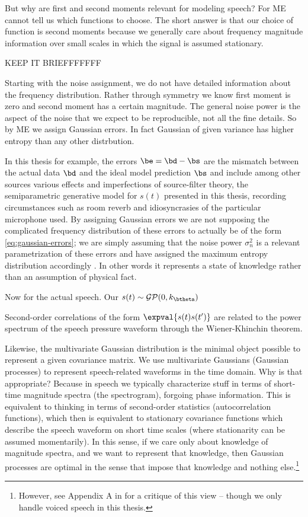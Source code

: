 \begin{chapterappendices}{5}
But why are first and second moments relevant for modeling speech?
For ME cannot tell us which functions to choose.
The short answer is that our choice of function is second moments because we generally care about frequency magnitude information over small scales in which the signal is assumed stationary.

KEEP IT BRIEFFFFFFF

Starting with the noise assignment, we do not have detailed information about the frequency distribution.
Rather through symmetry we know first moment is zero and second moment has a certain magnitude.
The general noise power is the aspect of the noise that we expect to be reproducible, not all the fine details.
So by ME we assign Gaussian errors.
In fact Gaussian of given variance has higher entropy than any other distrbution.

In this thesis for example,
the errors $\be = \bd - \bs$ are the mismatch between the actual data $\bd$ and the ideal model prediction $\bs$ and include among other sources various effects and imperfections of source-filter theory, the semiparametric generative model for $s(t)$ presented in this thesis, recording circumstances such as room reverb and idiosyncrasies of the particular microphone used.
By assigning Gaussian errors we are not supposing the complicated frequency distribution of these errors to actually be of the form \eqref{eq:gaussian-errors}; we are simply assuming that the noise power $\sigma_n^2$ is a relevant parametrization of these errors \citep{Bretthorst1999} and have assigned the maximum entropy distribution accordingly \citep{Jaynes2003}.
In other words it represents a state of knowledge rather than an assumption of physical fact.

Now for the actual speech.
Our $s(t) \sim \mathcal{GP}(0,k_\btheta)$

Second-order correlations of the form $\expval{s(t)s(t')}$ are related to the power spectrum of the speech pressure waveform through the Wiener-Khinchin theorem.


Likewise, the multivariate Gaussian distribution is the minimal object possible to represent a given covariance matrix.
We use multivariate Gaussians (Gaussian processes) to represent speech-related waveforms in the time domain.
Why is that appropriate?
Because in speech we typically characterize stuff in terms of short-time magnitude spectra (the spectrogram), forgoing phase information.
This is equivalent to thinking in terms of second-order statistics (autocorrelation functions), which then is equivalent to stationary covariance functions which describe the speech waveform on short time scales (where stationarity can be assumed momentarily).
In this sense, if we care only about knowledge of magnitude spectra, and we want to represent that knowledge, then Gaussian processes are optimal in the sense that impose that knowledge and nothing else.\footnote{%
	However, see Appendix A in  \citep{Oord2016} for a critique of this view -- though we only handle voiced speech in this thesis.
}


\end{chapterappendices}
